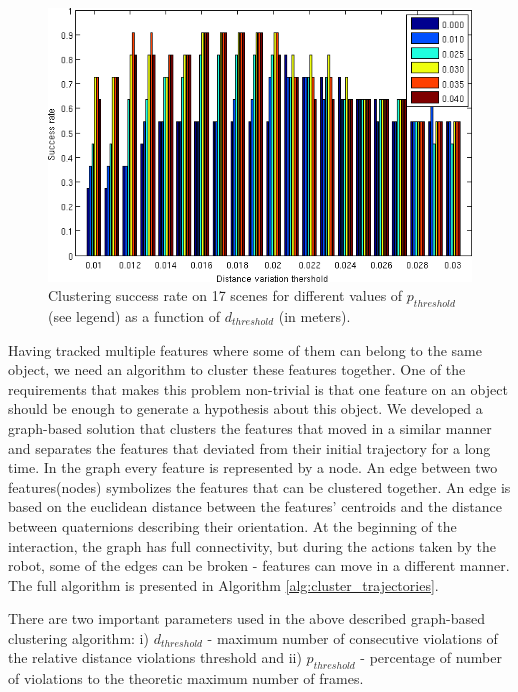 \begin{figure}[tb!]
   \begin{center}
     \includegraphics[width=.9\columnwidth]{figures/distribution.png}
		\vspace{-2ex}
   \caption{Clustering success rate on 17 scenes for different values of $p_{threshold}$ (see legend) as a function of $d_{threshold}$ (in meters).}
   \label{fig:clustering}
 \end{center}
 \end{figure}
Having tracked multiple features where some of them can belong to the same object, we need an algorithm to cluster these features together. One of the requirements that makes this problem non-trivial is that one feature on an object should be enough to generate a hypothesis about this object. We developed a graph-based solution that clusters the features that moved in a similar manner and separates the features that deviated from their initial trajectory for a long time. In the graph every feature is represented by a node. An edge between two features(nodes) symbolizes the features that can be clustered together. An edge is based on the euclidean distance between the features' centroids and the distance between quaternions describing their orientation. At the beginning of the interaction, the graph has full connectivity, but during the actions taken by the robot, some of the edges can be broken - features can move in a different manner.
The full algorithm is presented in Algorithm \ref{alg:cluster_trajectories}.

There are two important parameters used in the above described graph-based clustering algorithm: i) $d_{threshold}$ - maximum number of consecutive violations of the relative distance violations threshold and ii) $p_{threshold}$ - percentage of number of violations to the theoretic maximum number of frames.


